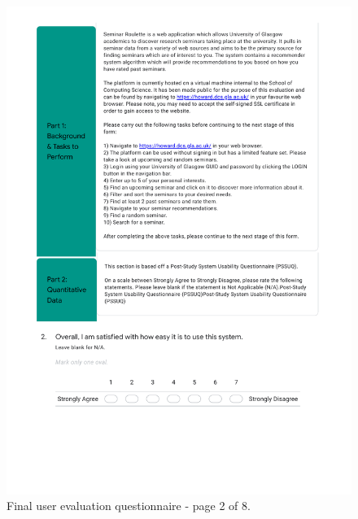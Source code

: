 \documentclass{l4proj}
\begin{document}
\begin{appendices}
\begin{figure}[htb]
    \centering
    \includegraphics[width=\linewidth]{images/final_evaluation_2.pdf}    
    \caption{Final user evaluation questionnaire - page 2 of 8.}
    \label{fig:final_evaluation_2} 
\end{figure}


\end{appendices}
\end{document}
